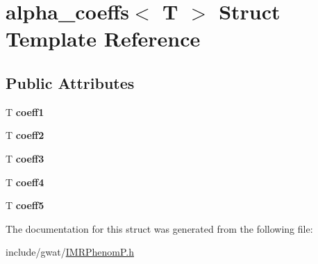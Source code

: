 \hypertarget{structalpha__coeffs}{}\section{alpha\+\_\+coeffs$<$ T $>$ Struct Template Reference}
\label{structalpha__coeffs}
\subsection*{Public Attributes}
\begin{DoxyCompactItemize}
\item 
\mbox{\label{structalpha__coeffs_a356cb953dd9baa5e858a64c4217617f7}} 
T {\bfseries coeff1}
\item 
\mbox{\label{structalpha__coeffs_af4bf78d9cff31f15e4b73a2ca85d2b0c}} 
T {\bfseries coeff2}
\item 
\mbox{\label{structalpha__coeffs_aad90fdea4b3981b943372a557af03fae}} 
T {\bfseries coeff3}
\item 
\mbox{\label{structalpha__coeffs_a899084d8794fc723c1ddc1bea7a12c88}} 
T {\bfseries coeff4}
\item 
\mbox{\label{structalpha__coeffs_a3ab4a5c15d8025b3f88ba05cb234d966}} 
T {\bfseries coeff5}
\end{DoxyCompactItemize}


The documentation for this struct was generated from the following file\+:\begin{DoxyCompactItemize}
\item 
include/gwat/\hyperlink{IMRPhenomP_8h}{I\+M\+R\+Phenom\+P.\+h}\end{DoxyCompactItemize}
